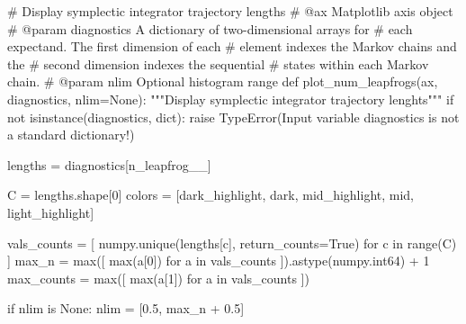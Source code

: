 \documentclass[
  letterpaper,
  DIV=11,
  numbers=noendperiod]{scrartcl}
\newenvironment{Shaded}{\begin{snugshade}}{\end{snugshade}}
\newcommand{\BuiltInTok}[1]{\textcolor[rgb]{0.00,0.23,0.31}{#1}}
\newcommand{\CommentTok}[1]{\textcolor[rgb]{0.37,0.37,0.37}{#1}}
\newcommand{\ControlFlowTok}[1]{\textcolor[rgb]{0.00,0.23,0.31}{#1}}
\newcommand{\DecValTok}[1]{\textcolor[rgb]{0.68,0.00,0.00}{#1}}
\newcommand{\FloatTok}[1]{\textcolor[rgb]{0.68,0.00,0.00}{#1}}
\newcommand{\KeywordTok}[1]{\textcolor[rgb]{0.00,0.23,0.31}{#1}}
\newcommand{\NormalTok}[1]{\textcolor[rgb]{0.00,0.23,0.31}{#1}}
\newcommand{\OperatorTok}[1]{\textcolor[rgb]{0.37,0.37,0.37}{#1}}
\newcommand{\PreprocessorTok}[1]{\textcolor[rgb]{0.68,0.00,0.00}{#1}}
\newcommand{\StringTok}[1]{\textcolor[rgb]{0.13,0.47,0.30}{#1}}
\newcommand{\VariableTok}[1]{\textcolor[rgb]{0.07,0.07,0.07}{#1}}
\begin{document}
\begin{Shaded}
\begin{Highlighting}[]
\CommentTok{\# Display symplectic integrator trajectory lengths}
\CommentTok{\# @ax Matplotlib axis object}
\CommentTok{\# @param diagnostics A dictionary of two{-}dimensional arrays for}
\CommentTok{\#                    each expectand.  The first dimension of each}
\CommentTok{\#                    element indexes the Markov chains and the}
\CommentTok{\#                    second dimension indexes the sequential}
\CommentTok{\#                    states within each Markov chain.}
\CommentTok{\# @param nlim Optional histogram range}
\KeywordTok{def}\NormalTok{ plot\_num\_leapfrogs(ax, diagnostics, nlim}\OperatorTok{=}\VariableTok{None}\NormalTok{):}
  \CommentTok{"""Display symplectic integrator trajectory lenghts"""}
  \ControlFlowTok{if} \KeywordTok{not} \BuiltInTok{isinstance}\NormalTok{(diagnostics, }\BuiltInTok{dict}\NormalTok{):}
    \ControlFlowTok{raise} \PreprocessorTok{TypeError}\NormalTok{(}\StringTok{\textquotesingle{}Input variable \textasciigrave{}diagnostics\textasciigrave{} is not a standard dictionary!\textquotesingle{}}\NormalTok{)}
  
\NormalTok{  lengths }\OperatorTok{=}\NormalTok{ diagnostics[}\StringTok{\textquotesingle{}n\_leapfrog\_\_\textquotesingle{}}\NormalTok{]}
  
\NormalTok{  C }\OperatorTok{=}\NormalTok{ lengths.shape[}\DecValTok{0}\NormalTok{]}
\NormalTok{  colors }\OperatorTok{=}\NormalTok{ [dark\_highlight, dark, mid\_highlight, mid, light\_highlight]}
  
\NormalTok{  vals\_counts }\OperatorTok{=}\NormalTok{ [ numpy.unique(lengths[c], return\_counts}\OperatorTok{=}\VariableTok{True}\NormalTok{) }
                  \ControlFlowTok{for}\NormalTok{ c }\KeywordTok{in} \BuiltInTok{range}\NormalTok{(C) ] }
\NormalTok{  max\_n }\OperatorTok{=} \BuiltInTok{max}\NormalTok{([ }\BuiltInTok{max}\NormalTok{(a[}\DecValTok{0}\NormalTok{]) }\ControlFlowTok{for}\NormalTok{ a }\KeywordTok{in}\NormalTok{ vals\_counts ]).astype(numpy.int64) }\OperatorTok{+} \DecValTok{1}
\NormalTok{  max\_counts }\OperatorTok{=} \BuiltInTok{max}\NormalTok{([ }\BuiltInTok{max}\NormalTok{(a[}\DecValTok{1}\NormalTok{]) }\ControlFlowTok{for}\NormalTok{ a }\KeywordTok{in}\NormalTok{ vals\_counts ])}
  
  \ControlFlowTok{if}\NormalTok{ nlim }\KeywordTok{is} \VariableTok{None}\NormalTok{:}
\NormalTok{    nlim }\OperatorTok{=}\NormalTok{ [}\FloatTok{0.5}\NormalTok{, max\_n }\OperatorTok{+} \FloatTok{0.5}\NormalTok{]}
  

\end{Highlighting}
\end{Shaded}
\end{document}
